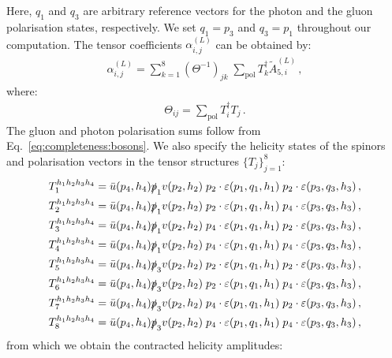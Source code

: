 \documentclass[main.tex]{subfiles}
\begin{document}
Here, $q_1$ and $q_3$ are arbitrary reference vectors for the photon and the gluon polarisation states, respectively.
We set $q_1=p_3$ and $q_3=p_1$ throughout our computation.
The tensor coefficients $\alpha^{(L)}_{i,j}$ can be obtained by:
\begin{align}
\alpha^{(L)}_{i,j} = \sum_{k=1}^{8} \left(\Theta^{-1}\right)_{jk} \; \sum_{\text{pol}} {T}_{k}^\dagger \tilde{A}_{5,i}^{(L)} \,,
\end{align}
where:
\begin{align}
\Theta_{ij}  = \sum_{\text{pol}} T_{i}^\dagger T_{j} \,.
\end{align}
The gluon and photon polarisation sums follow from Eq.~\ref{eq:completeness:bosons}. We also specify the helicity states of the spinors and polarisation vectors in the tensor structures $\{T_j\}_{j=1}^8$:
\begin{align}
T^{h_1 h_2 h_3 h_4}_{1} & = \bar{u}(p_4,h_4) \slashed{p}_{1} v(p_2,h_2) \; p_{2}\cdot \varepsilon(p_1,q_1,h_1) \; p_{2}\cdot\varepsilon(p_3,q_3,h_3) \,, \nonumber \\ 
T^{h_1 h_2 h_3 h_4}_{2} & = \bar{u}(p_4,h_4) \slashed{p}_{1} v(p_2,h_2) \; p_{2}\cdot \varepsilon(p_1,q_1,h_1) \; p_{4}\cdot\varepsilon(p_3,q_3,h_3) \,, \nonumber \\ 
T^{h_1 h_2 h_3 h_4}_{3} & = \bar{u}(p_4,h_4) \slashed{p}_{1} v(p_2,h_2) \; p_{4}\cdot \varepsilon(p_1,q_1,h_1) \; p_{2}\cdot\varepsilon(p_3,q_3,h_3) \,, \nonumber \\ 
T^{h_1 h_2 h_3 h_4}_{4} & = \bar{u}(p_4,h_4) \slashed{p}_{1} v(p_2,h_2) \; p_{4}\cdot \varepsilon(p_1,q_1,h_1) \; p_{4}\cdot\varepsilon(p_3,q_3,h_3) \,, \\
T^{h_1 h_2 h_3 h_4}_{5} & = \bar{u}(p_4,h_4) \slashed{p}_{3} v(p_2,h_2) \; p_{2}\cdot \varepsilon(p_1,q_1,h_1) \; p_{2}\cdot\varepsilon(p_3,q_3,h_3) \,, \nonumber \\ 
T^{h_1 h_2 h_3 h_4}_{6} & = \bar{u}(p_4,h_4) \slashed{p}_{3} v(p_2,h_2) \; p_{2}\cdot \varepsilon(p_1,q_1,h_1) \; p_{4}\cdot\varepsilon(p_3,q_3,h_3) \,, \nonumber \\ 
T^{h_1 h_2 h_3 h_4}_{7} & = \bar{u}(p_4,h_4) \slashed{p}_{3} v(p_2,h_2) \; p_{4}\cdot \varepsilon(p_1,q_1,h_1) \; p_{2}\cdot\varepsilon(p_3,q_3,h_3) \,, \nonumber \\ 
T^{h_1 h_2 h_3 h_4}_{8} & = \bar{u}(p_4,h_4) \slashed{p}_{3} v(p_2,h_2) \; p_{4}\cdot \varepsilon(p_1,q_1,h_1) \; p_{4}\cdot\varepsilon(p_3,q_3,h_3) \,, \nonumber
\end{align}
from which we obtain the contracted helicity amplitudes:
\end{document}
